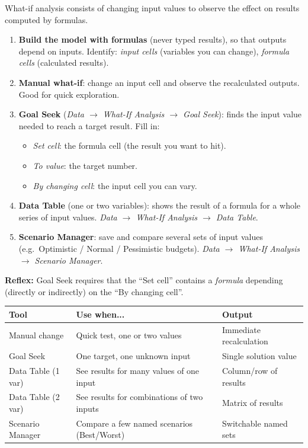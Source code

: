 \documentclass[11pt]{article}
\newcommand{\cle}[1]{{\popxbold\color{popdark}#1}}
\begin{document}
\begin{methode}
\cle{What-if analysis} consists of changing input values to observe the effect on results computed by formulas.
\begin{enumerate}
\item \textbf{Build the model with formulas} (never typed results), so that outputs depend on inputs. Identify: \emph{input cells} (variables you can change), \emph{formula cells} (calculated results).
\item \textbf{Manual what-if}: change an input cell and observe the recalculated outputs. Good for quick exploration.
\item \textbf{Goal Seek} (\emph{Data $\rightarrow$ What-If Analysis $\rightarrow$ Goal Seek}): finds the input value needed to reach a target result. Fill in:
\begin{itemize}
\item \emph{Set cell}: the formula cell (the result you want to hit).
\item \emph{To value}: the target number.
\item \emph{By changing cell}: the input cell you can vary.
\end{itemize}
\item \textbf{Data Table} (one or two variables): shows the result of a formula for a whole series of input values. \emph{Data $\rightarrow$ What-If Analysis $\rightarrow$ Data Table}.
\item \textbf{Scenario Manager}: save and compare several sets of input values (e.g.\ Optimistic / Normal / Pessimistic budgets). \emph{Data $\rightarrow$ What-If Analysis $\rightarrow$ Scenario Manager}.
\end{enumerate}
\textbf{Reflex:} Goal Seek requires that the ``Set cell'' contains a \emph{formula} depending (directly or indirectly) on the ``By changing cell''.
\end{methode}

\begin{aretenir}
\begin{center}
\begin{tabularx}{\linewidth}{|l|X|X|}\hline
\textbf{Tool} & \textbf{Use when...} & \textbf{Output} \\ \hline
Manual change & Quick test, one or two values & Immediate recalculation \\ \hline
Goal Seek & One target, one unknown input & Single solution value \\ \hline
Data Table (1 var) & See results for many values of one input & Column/row of results \\ \hline
Data Table (2 var) & See results for combinations of two inputs & Matrix of results \\ \hline
Scenario Manager & Compare a few named scenarios (Best/Worst) & Switchable named sets \\ \hline
\end{tabularx}
\end{center}
\end{aretenir}
\end{document}

